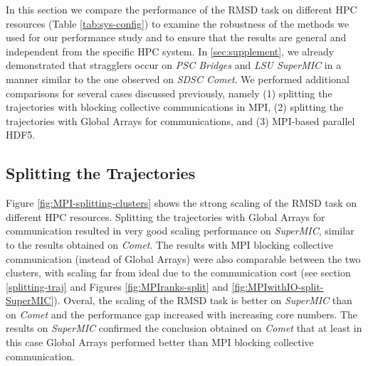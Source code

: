 \label{sec:clusters}

In this section we compare the performance of the RMSD task on different HPC resources (Table \ref{tab:sys-config}) to examine the robustness of the methods we used for our performance study and to ensure that the results are general and independent from the specific HPC system.
In \ref{sec:supplement}, we already demonstrated that stragglers occur on \emph{PSC Bridges} and \emph{LSU SuperMIC} in a manner similar to the one observed on \emph{SDSC Comet}.
We performed additional comparisons for several cases discussed previously, namely (1) splitting the trajectories with blocking collective communications in MPI, (2) splitting the trajectories with Global Arrays for communications, and (3) MPI-based parallel HDF5.

\subsection{Splitting the Trajectories}
Figure \ref{fig:MPI-splitting-clusters} shows the strong scaling of the RMSD task on different HPC resources.  
Splitting the trajectories with Global Arrays for communication resulted in very good scaling performance on \emph{SuperMIC}, similar to the results obtained on \emph{Comet}.
The results with MPI blocking collective communication (instead of Global Arrays) were also comparable between the two clusters, with scaling far from ideal due to the communication cost (see section \ref{splitting-traj} and Figures \ref{fig:MPIranks-split} and \ref{fig:MPIwithIO-split-SuperMIC}). 
Overal, the scaling of the RMSD task is better on \emph{SuperMIC} than on \emph{Comet} and the performance gap increased with increasing core numbers.
The results on \emph{SuperMIC} confirmed the conclusion obtained on \emph{Comet} that at least in this case Global Arrays performed better than MPI blocking collective communication.

